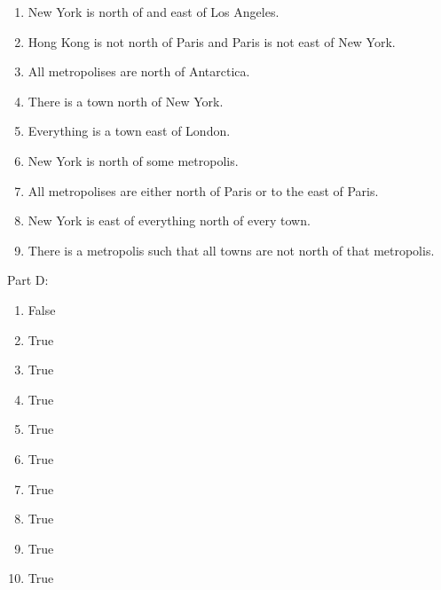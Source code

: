 \documentclass[
]{book}
\providecommand{\tightlist}{%
  \setlength{\itemsep}{0pt}\setlength{\parskip}{0pt}}
\begin{document}
\begin{enumerate}
\def\labelenumi{\arabic{enumi}.}
\tightlist
\item
  New York is north of and east of Los Angeles.
\item
  Hong Kong is not north of Paris and Paris is not east of New York.
\item
  All metropolises are north of Antarctica.
\item
  There is a town north of New York.
\item
  Everything is a town east of London.
\item
  New York is north of some metropolis.
\item
  All metropolises are either north of Paris or to the east of Paris.
\item
  New York is east of everything north of every town.
\item
  There is a metropolis such that all towns are not north of that metropolis.
\end{enumerate}

Part D:

\begin{enumerate}
\def\labelenumi{\arabic{enumi}.}
\tightlist
\item
  False
\item
  True
\item
  True
\item
  True
\item
  True
\item
  True
\item
  True
\item
  True
\item
  True
\item
  True
\end{enumerate}

  
\end{document}

